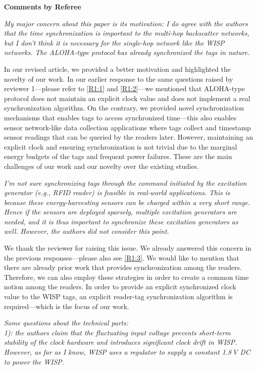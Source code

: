 \documentclass[10pt]{article}
\newcommand{\referee}[1]{
	{\item \color{OliveGreen} \emph{{#1}}}
	\label{R\therefereeCounter:\arabic{enumi}}
}
\newcommand{\response}[1]{{\color{blue} #1}}
\newcounter{refereeCounter}
\newenvironment{responses}{%
\refstepcounter{refereeCounter}%
\textbf{\large Comments by Referee \therefereeCounter}
\begin{enumerate}%
\renewcommand{\labelenumi}{\textbf{[R\therefereeCounter :\,\arabic{enumi}]}} %
}{\end{enumerate}}
\begin{document}
\begin{responses}
	
\referee{My major concern about this paper is its motivation: I do agree with the authors that the time synchronization is important to the multi-hop backscatter networks, but I don’t think it is necessary for the single-hop network like the WISP networks. The ALOHA-type protocol has already synchronized the tags in nature.}
	
\response{In our revised article, we provided a better motivation and highlighted the novelty of our work. In our earlier response to the same questions raised by reviewer 1---please refer to \hyperref[R1:1]{[R1:1]} and \hyperref[R1:2]{[R1:2]}---we mentioned that ALOHA-type protocol does not maintain an explicit clock value and does not implement a real synchronization algorithm. On the contrary, we provided novel synchronization mechanisms that enables tags to access synchronized time---this also enables sensor network-like data collection applications where tags collect and timestamp sensor readings that can be queried by the readers later. However, maintaining an explicit clock and ensuring synchronization is not trivial due to the marginal energy budgets of the tags and frequent power failures. These are the main challenges of our work and our novelty over the existing studies.}
	
\referee{I’m not sure synchronizing tags through the command initiated by the excitation generator (e.g., RFID reader) is feasible in real-world applications. This is because these energy-harvesting sensors can be charged within a very short range. Hence if the sensors are deployed sparsely, multiple excitation generators are needed, and it is thus important to synchronize these excitation generators as well. However, the authors did not consider this point.
}
	
\response{We thank the reviewer for raising this issue. We already answered this concern in the previous responses---please also see \hyperref[R1:3]{[R1:3]}. We would like to mention that there are already prior work that provides synchronization among the readers. Therefore, we can also employ these strategies in order to create a common time notion among the readers. In order to provide an explicit synchronized clock value to the WISP tags, an explicit reader-tag synchronization algorithm is required---which is the focus of our work.}
	
\referee{Some questions about the technical parts: \\
1): the authors claim that the fluctuating input voltage prevents short-term stability of the clock hardware and introduces significant clock drift in WISP. However, as far as I know, WISP uses a regulator to supply a constant 1.8\,V DC to power the WISP.}
	

\end{responses}
\end{document}
